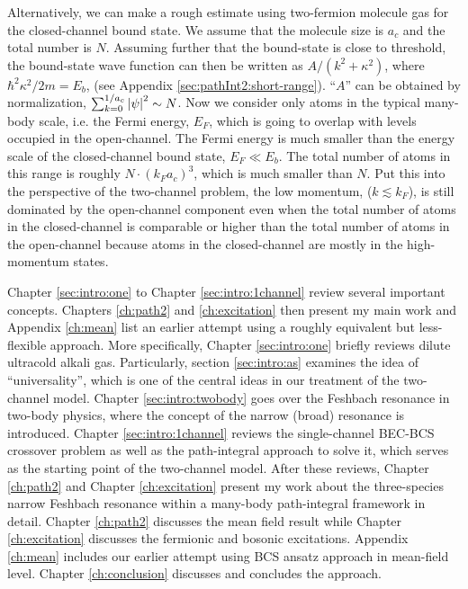 Alternatively, we can make a rough estimate using two-fermion molecule gas for the closed-channel bound state. We assume that the molecule size is $a_{c}$ and the total number is $N$.  Assuming further that the bound-state is close to threshold,   the bound-state wave function can then be written as $A/(k^{2}+\kappa^{2})$, where $\hbar^{2}\kappa^{2}/2m=E_{b}$, (see Appendix \ref{sec:pathInt2:short-range}). ``$A$'' can be obtained by normalization, $\sum_{k=0}^{1/a_{c}}\left\lvert{\psi}\right\rvert^{2}\sim{}N$. Now  we consider only atoms in the typical many-body scale, i.e. the Fermi energy, $E_{F}$, which is going to overlap with levels occupied in the open-channel. The Fermi energy is much smaller than the energy scale of the closed-channel bound state, $E_{F}\ll{}E_b$.  The total number of atoms in this range is roughly $N\cdot(k_{F}a_{c})^{3}$, which is much smaller than $N$. Put this into the perspective of the two-channel problem, the low momentum,  ($k\lesssim{}k_F$), is still dominated by the open-channel component even when the total number of atoms in the closed-channel is comparable or higher than the total number  of atoms in the open-channel because atoms in the closed-channel are mostly in the high-momentum states.     

Chapter \ref{sec:intro:one} to Chapter \ref{sec:intro:1channel} review several important concepts.  Chapters \ref{ch:path2} and \ref{ch:excitation} then present my main work  and Appendix \ref{ch:mean}  list an earlier attempt using a roughly equivalent but less-flexible approach.  More specifically, Chapter \ref{sec:intro:one} briefly reviews  dilute ultracold alkali gas.   Particularly, section \ref{sec:intro:as} examines the idea of ``universality'', which is one of the central ideas in our treatment of the two-channel model.  Chapter \ref{sec:intro:twobody} goes over the Feshbach resonance in two-body physics, where the concept of  the narrow (broad) resonance is introduced. Chapter \ref{sec:intro:1channel} reviews the single-channel BEC-BCS crossover problem as well as the path-integral approach to solve it, which serves as the starting point of the two-channel model. After these reviews,   Chapter \ref{ch:path2} and Chapter \ref{ch:excitation} present my work about the three-species narrow Feshbach resonance within a many-body path-integral framework in detail.   Chapter \ref{ch:path2} discusses the mean field result while Chapter \ref{ch:excitation} discusses the fermionic and bosonic excitations. Appendix \ref{ch:mean} includes our earlier attempt   using BCS ansatz  approach in mean-field level.  Chapter \ref{ch:conclusion} discusses and concludes the approach.  

